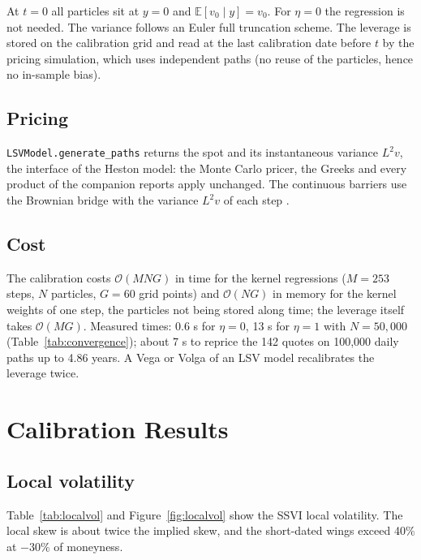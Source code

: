 \documentclass[11pt,a4paper]{article}
\newcommand{\E}{\mathbb{E}}
\newcommand{\code}[1]{\texttt{#1}}
\begin{document}
At $t = 0$ all particles sit at $y = 0$ and $\E[v_0 \mid y] = v_0$. For $\eta = 0$ the regression is not needed. The
variance follows an Euler full truncation scheme. The leverage is stored on the calibration grid and read at the
last calibration date before $t$ by the pricing simulation, which uses independent paths (no reuse of the particles,
hence no in-sample bias).

\subsection{Pricing}
\code{LSVModel.generate\_paths} returns the spot and its instantaneous variance $L^2 v$, the interface of the Heston
model: the Monte Carlo pricer, the Greeks and every product of the companion reports apply unchanged. The continuous
barriers use the Brownian bridge with the variance $L^2 v$ of each step \cite{benguedda2026barrier}.

\subsection{Cost}
The calibration costs $\mathcal{O}(M N G)$ in time for the kernel regressions ($M = 253$ steps, $N$ particles,
$G = 60$ grid points) and $\mathcal{O}(N G)$ in memory for the kernel weights of one step, the particles not being
stored along time; the leverage itself takes $\mathcal{O}(MG)$. Measured times: 0.6 s for $\eta = 0$, 13 s for
$\eta = 1$ with $N = 50{,}000$ (Table~\ref{tab:convergence}); about 7 s to reprice the 142 quotes on 100{,}000 daily
paths up to 4.86 years. A Vega or Volga of an LSV model recalibrates the leverage twice.

\section{Calibration Results}\label{sec:calibration}

\subsection{Local volatility}
Table~\ref{tab:localvol} and Figure~\ref{fig:localvol} show the SSVI local volatility. The local skew is about twice
the implied skew, and the short-dated wings exceed 40\% at $-30\%$ of moneyness.
\end{document}
